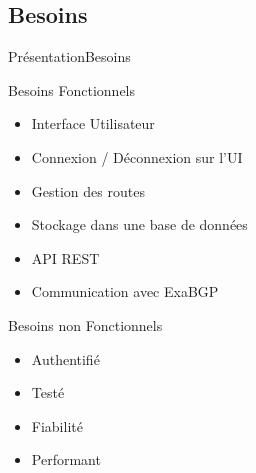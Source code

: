 \subsection{Besoins}

\begin{frame}{Présentation}{Besoins}
\begin{block}{Besoins Fonctionnels}
\begin{itemize}
	\item Interface Utilisateur
    \item Connexion / Déconnexion sur l'UI
	\item Gestion des routes
	\item Stockage dans une base de données
	\item API REST
	\item Communication avec ExaBGP
\end{itemize}
\end{block}

\begin{exampleblock}{Besoins non Fonctionnels}
\begin{itemize}
	\item Authentifié
	\item Testé
	\item Fiabilité
	\item Performant
\end{itemize}
\end{exampleblock}
\end{frame}